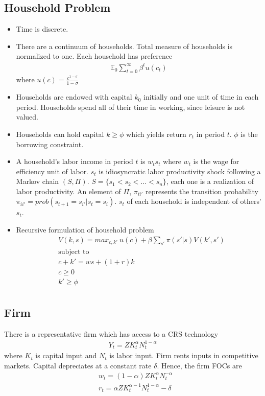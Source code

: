 \documentclass{article}
\begin{document}
\begin{spacing}{1.5}
\subsection{Household Problem}
\begin{itemize}
\item Time is discrete. 
\item There are a continuum of households. Total measure of households is normalized to one. Each household has preference
\begin{align*}
\mathbb{E}_0\sum_{t=0}^{\infty}\beta^tu(c_t)
\end{align*}
where $u(c)=\frac{c^{1-\sigma}}{1-\sigma}$
\item Households are endowed with capital $k_0$ initially and one unit of time in each period. Households spend all of their time in working, since leisure is not valued.
\item Households can hold capital $k\geq\phi$ which yields return $r_t$ in period $t$. $\phi$ is the borrowing constraint.
\item A household's labor income in period $t$ is $w_ts_t$ where $w_t$ is the wage for efficiency unit of labor. $s_t$ is idiosyncratic labor productivity shock following a Markov chain $(S,\Pi)$. $S=\{s_1<s_2<...<s_n\}$, each one is a realization of labor productivity. An element of $\Pi$, $\pi_{ii'}$ represents the transition probability $\pi_{ii'}=prob(s_{t+1}=s_{i'}|s_t=s_i)$. $s_t$ of each household is independent of others' $s_t$.
\item Recursive formulation of household problem
\begin{align*}
&V(k,s)=max_{c,k'}{ \ u(c)+\beta\sum_{s'}\pi(s'|s)V(k',s') }\\
&\text{subject to}\\
&c+k'=ws+(1+r)k\\
&c\geq0\\
&k'\geq\phi\\
\end{align*}
\end{itemize}

\subsection{Firm}
There is a representative firm which has access to a CRS technology
\begin{align*}
Y_t=ZK_t^{\alpha}N_t^{1-\alpha}
\end{align*}
where $K_t$ is capital input and $N_t$ is labor input. Firm rents inputs in competitive markets. Capital depreciates at a constant rate $\delta$. Hence, the firm FOCs are
\begin{align*}
&w_t=(1-\alpha)ZK_t^{\alpha}N_t^{-\alpha}\\
&r_t=\alpha ZK_t^{\alpha-1}N_t^{1-\alpha}-\delta\\
\end{align*}


\end{spacing}
\end{document}
